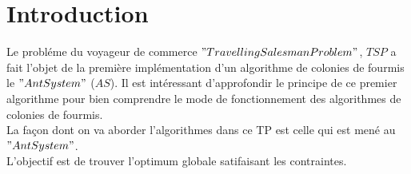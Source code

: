 

\section*{Introduction}

Le probl\'eme du voyageur de commerce $ "Travelling Salesman Problem" $, $TSP$ a fait l'objet de la premi\`ere impl\'ementation d'un algorithme de colonies de fourmis le $ "Ant System" $ ($AS$). Il est intéressant d'approfondir le principe de ce premier algorithme pour bien comprendre le mode de fonctionnement des algorithmes de colonies de fourmis.\\
La façon dont on va aborder  l'algorithmes dans ce TP est celle qui est men\'e au $ "Ant System" $.\\
L'objectif est de trouver l'optimum globale satifaisant les contraintes.
